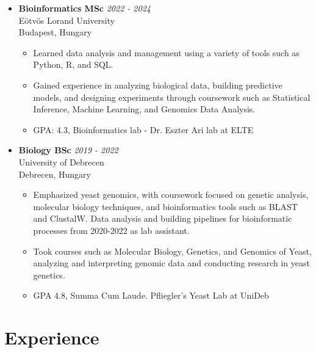 \documentclass[11pt,a4paper]{article}
\begin{document}
\begin{itemize}

    \item \textbf{Bioinformatics MSc} \hfill \textit{2022 - 2024} \\
    Eötvös Lorand University \\
    Budapest, Hungary \\
    \begin{itemize}
        \item Learned data analysis and management using a variety of tools such as Python, R, and SQL. 

        \item Gained experience in analyzing biological data, building predictive models, and designing experiments through coursework such as Statistical Inference, Machine Learning, and Genomics Data Analysis.
        \item GPA: 4.3, Bioinformatics lab - Dr. Eszter Ari lab at ELTE
    \end{itemize}
    
    \item \textbf{Biology BSc} \hfill \textit{2019 - 2022} \\
    University of Debrecen \\
    Debrecen, Hungary \\
    \begin{itemize}
        \item Emphasized yeast genomics, with coursework focused on genetic analysis, molecular biology techniques, and bioinformatics tools such as BLAST and ClustalW. Data analysis and building pipelines for bioinformatic processes from 2020-2022 as lab assistant. 
        \item Took courses such as Molecular Biology, Genetics, and Genomics of Yeast, analyzing and interpreting genomic data and conducting research in yeast genetics.
        \item GPA 4.8, Summa Cum Laude. Pfliegler's Yeast Lab at UniDeb
    \end{itemize}

    
\end{itemize}

\section*{Experience}
\end{document}
